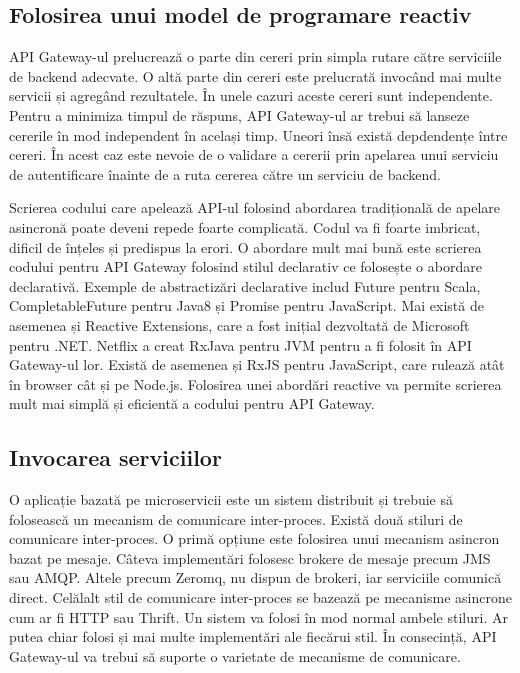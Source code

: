 \documentclass[12pt, a4paper, oneside, romanian]{teza-upb}
\begin{document}
\subsection{Folosirea unui model de programare reactiv}

API Gateway-ul prelucrează o parte din cereri prin simpla rutare către serviciile de backend adecvate. O altă parte din cereri este prelucrată invocând mai multe servicii și agregând rezultatele. În unele cazuri aceste cereri sunt independente. Pentru a minimiza timpul de răspuns, API Gateway-ul ar trebui să lanseze cererile în mod independent în același timp. Uneori însă există depdendențe între cereri. În acest caz este nevoie de o validare a cererii prin apelarea unui serviciu de autentificare înainte de a ruta cererea către un serviciu de backend. 

Scrierea codului care apelează API-ul folosind abordarea tradițională de apelare asincronă poate deveni repede foarte complicată. Codul va fi foarte imbricat, dificil de înțeles și predispus la erori. O abordare mult mai bună este scrierea codului pentru API Gateway folosind stilul declarativ ce folosește o abordare declarativă. Exemple de abstractizări declarative includ Future pentru Scala, CompletableFuture pentru Java8 și Promise pentru JavaScript. Mai există de asemenea și Reactive Extensions, care a fost inițial dezvoltată de Microsoft pentru .NET. Netflix a creat RxJava pentru JVM pentru a fi folosit în API Gateway-ul lor. Există de asemenea și RxJS pentru JavaScript, care rulează atât în browser cât și pe Node.js. Folosirea unei abordări reactive va permite scrierea mult mai simplă și eficientă a codului pentru API Gateway. 

\subsection{Invocarea serviciilor}

O aplicație bazată pe microservicii este un sistem distribuit și trebuie să folosească un mecanism de comunicare inter-proces. Există două stiluri de comunicare inter-proces. O primă opțiune este folosirea unui mecanism asincron bazat pe mesaje. Câteva implementări folosesc brokere de mesaje precum JMS sau AMQP. Altele precum Zeromq, nu dispun de brokeri, iar serviciile comunică direct. Celălalt stil de comunicare inter-proces se bazează pe mecanisme asincrone cum ar fi HTTP sau Thrift. Un sistem va folosi în mod normal ambele stiluri. Ar putea chiar folosi și mai multe implementări ale fiecărui stil. În consecință, API Gateway-ul va trebui să suporte o varietate de mecanisme de comunicare. 
\end{document}

